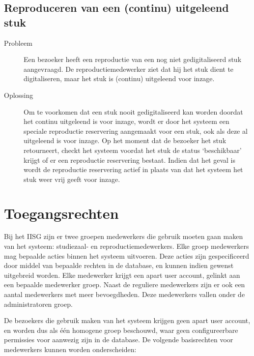 \documentclass[a4paper,titlepage]{report}
\begin{document}
    \subsection{Reproduceren van een (continu) uitgeleend stuk}
    \label{subsec:repro_uitgeleend}
    \begin{description}
      \item[Probleem] Een bezoeker heeft een reproductie van een nog niet
        gedigitaliseerd stuk aangevraagd. De reproductiemedewerker ziet dat
        hij het stuk dient te digitaliseren, maar het stuk is (continu)
        uitgeleend voor inzage.
      \item[Oplossing] Om te voorkomen dat een stuk nooit gedigitaliseerd kan
        worden doordat het continu uitgeleend is voor inzage, wordt er door
        het systeem een speciale reproductie reservering aangemaakt voor een
        stuk, ook als deze al uitgeleend is voor inzage. Op het moment dat de
        bezoeker het stuk retourneert, checkt het systeem voordat het stuk de
        status `beschikbaar' krijgt of er een reproductie reservering bestaat.
        Indien dat het geval is wordt de reproductie reservering actief in
        plaats van dat het systeem het stuk weer vrij geeft voor inzage.
    \end{description}
    
  \section{Toegangsrechten}
  \label{sec:toegangsrechten}
  Bij het IISG zijn er twee groepen medewerkers die gebruik moeten gaan maken
  van het systeem: studiezaal- en reproductiemedewerkers.
  Elke groep medewerkers mag bepaalde acties binnen het systeem uitvoeren. Deze
  acties zijn gespecificeerd door middel van bepaalde rechten in de database,
  en kunnen indien gewenst uitgebreid worden. Elke medewerker krijgt een apart
  user account, gelinkt aan een bepaalde medewerker groep. Naast de reguliere
  medewerkers zijn er ook een aantal medewerkers met meer bevoegdheden. Deze
  medewerkers vallen onder de administratoren groep. 
  
  De bezoekers die gebruik maken van het systeem krijgen geen apart user
  account, en worden dus als \'e\'en homogene groep beschouwd, waar geen
  configureerbare permissies voor aanwezig zijn in de database.
 \clearpage 
  De volgende basisrechten voor medewerkers kunnen worden onderscheiden:
  
\end{document}
